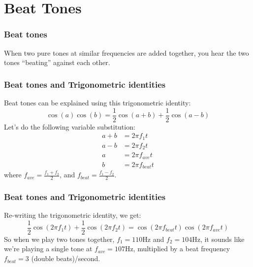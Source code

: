 \documentclass{beamer}
\begin{document}
\section[Beating]{Beat Tones}
\setcounter{subsection}{1}

\begin{frame}
  \frametitle{Beat tones}

  When two pure tones at similar frequencies are added together, you hear the  two tones
  ``beating'' against each other.
  \vspace*{1cm}
  \centerline{}
\end{frame}

\begin{frame}
  \frametitle{Beat tones and Trigonometric identities}

  Beat tones can be explained using this trigonometric identity:
  \[
  \cos(a)\cos(b)=\frac{1}{2}\cos(a+b)+\frac{1}{2}\cos(a-b)
  \]
  Let's do the following variable substitution:
  \begin{align*}
    a+b &= 2\pi f_1 t\\
    a-b &= 2\pi f_2 t\\
    a &= 2\pi f_{ave}t\\
    b &= 2\pi f_{beat}t
  \end{align*}
  where $f_{ave}=\frac{f_1+f_2}{2}$, and $f_{beat}=\frac{f_1-f_2}{2}$.
\end{frame}

\begin{frame}
  \frametitle{Beat tones and Trigonometric identities}

  Re-writing the trigonometric identity, we get:
  \[
  \frac{1}{2}\cos(2\pi f_1t)+\frac{1}{2}\cos(2\pi f_2 t) = \cos(2\pi f_{beat}t)\cos(2\pi f_{ave}t)
  \]
  So when we play two tones together, $f_1=110$Hz and $f_2=104$Hz, it
  sounds like we're playing a single tone at $f_{ave}=107$Hz,
  multiplied by a beat frequency $f_{beat}=3$ (double beats)/second.
\end{frame}

\end{document}
